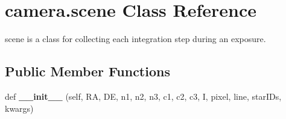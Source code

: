 \hypertarget{classcamera_1_1scene}{}\section{camera.\+scene Class Reference}
\label{classcamera_1_1scene}


scene is a class for collecting each integration step during an exposure.  


\subsection*{Public Member Functions}
\begin{DoxyCompactItemize}
\item 
\mbox{\label{classcamera_1_1scene_a327acdbc55c06cc821763062bc1b495d}} 
def {\bfseries \+\_\+\+\_\+init\+\_\+\+\_\+} (self, RA, DE, n1, n2, n3, c1, c2, c3, I, pixel, line, star\+I\+Ds, kwargs)
\end{DoxyCompactItemize}
